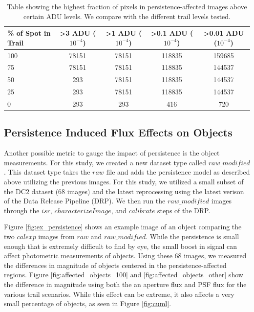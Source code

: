 \documentclass[DM,authoryear,toc]{lsstdoc}
\begin{document}
  \begin{table}[h!]
    \centering
    \begin{tabular}{|lcccc|}
    \hline
    \% of Spot in Trail & >3 ADU ($10^{-4}$) & >1 ADU ($10^{-4}$) & >0.1 ADU ($10^{-4}$) & >0.01 ADU ($10^{-4}$) \\
    \hline
    100 & 78151 & 78151 & 118835  & 159685 \\
    75 & 78151 & 78151 & 118835 & 144537 \\
    50 & 293 & 78151 & 118835 & 144537 \\
    25 & 293 & 78151 & 118835 & 144537 \\
    0 & 293 & 293 & 416 & 720 \\
    \hline
    \end{tabular}\label{tab:persis_affected_highest number}
    \caption{Table showing the highest fraction of pixels in persistence-affected images above certain ADU levels. 
    We compare with the different trail levels tested.
    }  
    \end{table}
    


\subsection{Persistence Induced Flux Effects on Objects}

Another possible metric to gauge the impact of persistence is the object measurements.
For this study, we created a new dataset type called \texttt{$raw\_modified$}. 
This dataset type takes the \texttt{$raw$} file and adds the persistence model as described above utilizing the previous images.
For this study, we utilized a small subset of the DC2 dataset (68 images) and the latest reprocessing using the latest verison of the Data Release Pipeline (DRP).
We then run the \texttt{$raw\_modified$} images through the \texttt{$isr$}, \texttt{$characterizeImage$}, and \texttt{$calibrate$} steps of the DRP\@. 

Figure \ref{fig:ex_persistence} shows an example image of an object comparing the two \texttt{$calexp$} images from \texttt{$raw$} and \texttt{$raw\_modified$}.
While the persistence is small enough that is extremely difficult to find by eye, the small boost in signal can affect photometric measurements of objects.
Using these 68 images, we measured the differences in magnitude of objects centered in the persistence-affected regions.
Figure \ref{fig:affected_objects_100} and \ref{fig:affected_objects_other} show the difference in magnitude using both the an aperture flux and PSF flux for the various trail scenarios.
While this effect can be extreme, it also affects a very small percentage of objects, as seen in Figure \ref{fig:cuml}.
\end{document}
